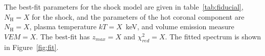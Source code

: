 The best-fit parameters for the shock model are given in table~\ref{tab:fiducial}, $N_\textrm{H}=X$ for the shock, and the parameters of the hot coronal component are $N_\textrm{H}=X$, plasma temperature $kT = X $~keV, and volume emission measure $VEM=X$. The best-fit has $z_{max} = X$ and $\chi^2_{red}= X$. The fitted spectrum is shown in Figure~\ref{fig:fit}.